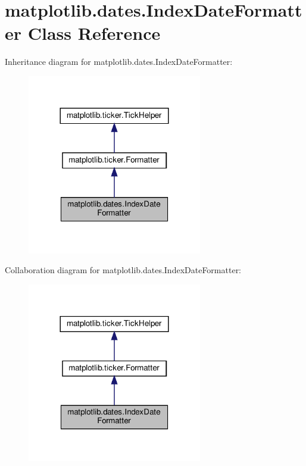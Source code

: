 \hypertarget{classmatplotlib_1_1dates_1_1IndexDateFormatter}{}\section{matplotlib.\+dates.\+Index\+Date\+Formatter Class Reference}
\label{classmatplotlib_1_1dates_1_1IndexDateFormatter}


Inheritance diagram for matplotlib.\+dates.\+Index\+Date\+Formatter\+:
\nopagebreak
\begin{figure}[H]
\begin{center}
\leavevmode
\includegraphics[width=216pt]{classmatplotlib_1_1dates_1_1IndexDateFormatter__inherit__graph}
\end{center}
\end{figure}


Collaboration diagram for matplotlib.\+dates.\+Index\+Date\+Formatter\+:
\nopagebreak
\begin{figure}[H]
\begin{center}
\leavevmode
\includegraphics[width=216pt]{classmatplotlib_1_1dates_1_1IndexDateFormatter__coll__graph}
\end{center}
\end{figure}
